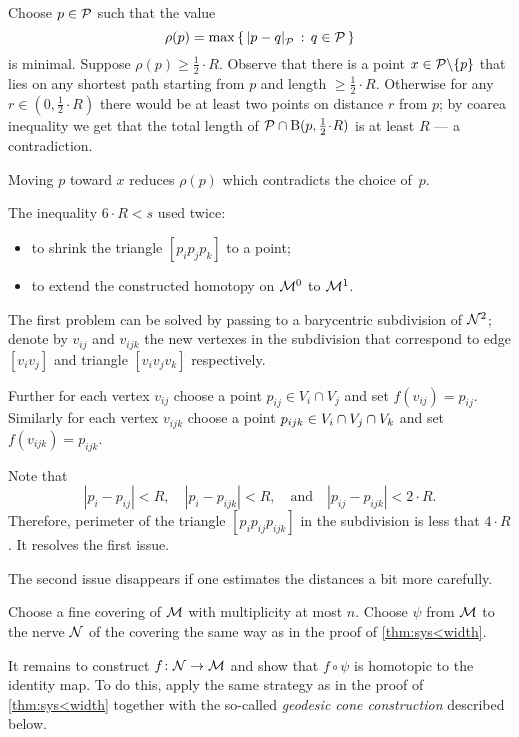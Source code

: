 Choose $p\in\mathcal{P}$ such that the value
\[\rho(p)=\max\set{\dist{p}{q}{\spc{P}}}{q\in\spc{P}}\]
is minimal.
Suppose $\rho(p)\ge\tfrac 12\cdot R$.
Observe that there is a point $x\z\in \spc{P}\backslash\{p\}$ that lies on any shortest path starting from $p$ and length $\ge\tfrac 12\cdot R$.
Otherwise for any $r\in(0,\tfrac 12\cdot R)$ there would be at least two points on distance $r$ from $p$;
by coarea inequality we get that the total length of $\spc{P}\cap \oBall(p,\tfrac 12\cdot R)$ is at least $R$ --- a contradiction.

Moving $p$ toward $x$ reduces $\rho(p)$ which contradicts the choice of~$p$.

The inequality $6\cdot R<s$ used twice:
\begin{itemize}
\item to shrink the triangle $[p_ip_jp_k]$ to a point;
\item to extend the constructed homotopy on $\mathcal{M}^0$ to $\mathcal{M}^1$.
\end{itemize}

The first problem can be solved by passing to a barycentric subdivision of $\mathcal{N}^2$;
denote by $v_{ij}$ and $v_{ijk}$ the new vertexes in the subdivision that correspond to edge $[v_iv_j]$ and triangle $[v_iv_jv_k]$ respectively.

Further for each vertex $v_{ij}$ choose a point $p_{ij}\in V_i\cap V_j$ and set $f(v_{ij})=p_{ij}$.
Similarly for each vertex $v_{ijk}$ choose a point $p_{ijk}\z\in V_i\cap V_j\cap V_k$ and set $f(v_{ijk})=p_{ijk}$.

Note that 
\[|p_i-p_{ij}|<R,\quad |p_i-p_{ijk}|<R,\quad\text{and}\quad |p_{ij}-p_{ijk}|<2\cdot R.\]
Therefore, perimeter of the triangle $[p_ip_{ij}p_{ijk}]$ in the subdivision is less that $4\cdot R$.
It resolves the first issue.

The second issue disappears if one estimates the distances a bit more carefully.
 
Choose a fine covering of $\mathcal{M}$ with multiplicity at most $n$.
Choose $\psi$ from $\mathcal{M}$ to the nerve $\mathcal{N}$ of the covering the same way as in the proof of \ref{thm:sys<width}.

It remains to construct $f\colon\mathcal{N}\to\mathcal{M}$ and show that $f\circ\psi$ is homotopic to the identity map.
To do this, apply the same strategy as in the proof of \ref{thm:sys<width} together with the so-called \emph{geodesic cone construction}
described below.

